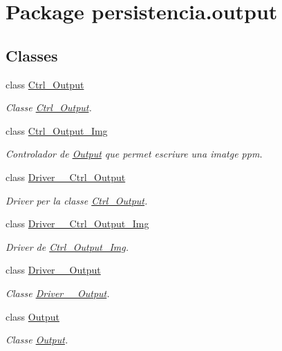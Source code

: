 \hypertarget{namespacepersistencia_1_1output}{}\section{Package persistencia.\+output}
\label{namespacepersistencia_1_1output}
\subsection*{Classes}
\begin{DoxyCompactItemize}
\item 
class \hyperlink{classpersistencia_1_1output_1_1Ctrl__Output}{Ctrl\+\_\+\+Output}
\begin{DoxyCompactList}\small\item\em Classe \hyperlink{classpersistencia_1_1output_1_1Ctrl__Output}{Ctrl\+\_\+\+Output}. \end{DoxyCompactList}\item 
class \hyperlink{classpersistencia_1_1output_1_1Ctrl__Output__Img}{Ctrl\+\_\+\+Output\+\_\+\+Img}
\begin{DoxyCompactList}\small\item\em Controlador de \hyperlink{classpersistencia_1_1output_1_1Output}{Output} que permet escriure una imatge ppm. \end{DoxyCompactList}\item 
class \hyperlink{classpersistencia_1_1output_1_1Driver____Ctrl__Output}{Driver\+\_\+\+\_\+\+Ctrl\+\_\+\+Output}
\begin{DoxyCompactList}\small\item\em Driver per la classe \hyperlink{classpersistencia_1_1output_1_1Ctrl__Output}{Ctrl\+\_\+\+Output}. \end{DoxyCompactList}\item 
class \hyperlink{classpersistencia_1_1output_1_1Driver____Ctrl__Output__Img}{Driver\+\_\+\+\_\+\+Ctrl\+\_\+\+Output\+\_\+\+Img}
\begin{DoxyCompactList}\small\item\em Driver de \hyperlink{classpersistencia_1_1output_1_1Ctrl__Output__Img}{Ctrl\+\_\+\+Output\+\_\+\+Img}. \end{DoxyCompactList}\item 
class \hyperlink{classpersistencia_1_1output_1_1Driver____Output}{Driver\+\_\+\+\_\+\+Output}
\begin{DoxyCompactList}\small\item\em Classe \hyperlink{classpersistencia_1_1output_1_1Driver____Output}{Driver\+\_\+\+\_\+\+Output}. \end{DoxyCompactList}\item 
class \hyperlink{classpersistencia_1_1output_1_1Output}{Output}
\begin{DoxyCompactList}\small\item\em Classe \hyperlink{classpersistencia_1_1output_1_1Output}{Output}. \end{DoxyCompactList}\end{DoxyCompactItemize}
